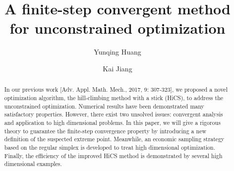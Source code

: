 \documentclass[final,1p,times]{elsarticle}
\begin{document}
\begin{frontmatter}

\title{A finite-step convergent method for unconstrained optimization}




\author[xtu]{Yunqing Huang }


\author[xtu]{Kai Jiang}

\address[xtu]{School of Mathematics and Computational
 Science, 
 \\
Hunan Key Laboratory for Computation and Simulation in Science
and Engineering, Xiangtan University, P.R. China, 411105
 }



\begin{abstract}
In our previous work [Adv. Appl. Math. Mech., 2017, 9: 307-323],
we proposed a novel optimization algorithm, the hill-climbing
method with a stick (HiCS), to address the unconstrained optimization. Numerical
results have been demonstrated many satisfactory properties.
However, there exist two unsolved issues: convergent
analysis and application to high dimensional problems. 
In this paper, we will give a rigorous theory to guarantee the finite-step
convergence property by introducing a new definition of the suspected
extreme point. Meanwhile, an economic sampling
strategy based on the regular simplex is
developed to treat high dimensional optimization. Finally, 
the efficiency of the improved HiCS method is demonstrated by several
high dimensional examples.
\end{abstract}


\end{frontmatter}
\end{document}
